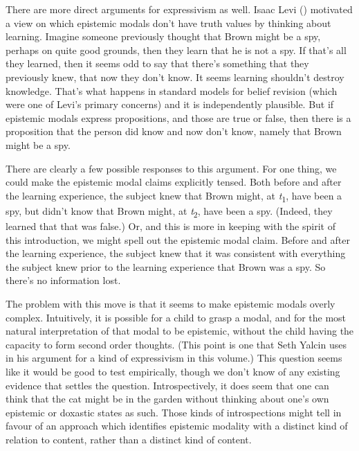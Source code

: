 \documentclass[
  10pt,
  letterpaper,
  DIV=11,
  numbers=noendperiod,
  twoside]{scrartcl}
\begin{document}
There are more direct arguments for expressivism as well. Isaac Levi
() motivated a view on which epistemic
modals don't have truth values by thinking about learning. Imagine
someone previously thought that Brown might be a spy, perhaps on quite
good grounds, then they learn that he is not a spy. If that's all they
learned, then it seems odd to say that there's something that they
previously knew, that now they don't know. It seems learning shouldn't
destroy knowledge. That's what happens in standard models for belief
revision (which were one of Levi's primary concerns) and it is
independently plausible. But if epistemic modals express propositions,
and those are true or false, then there is a proposition that the person
did know and now don't know, namely that Brown might be a spy.

There are clearly a few possible responses to this argument. For one
thing, we could make the epistemic modal claims explicitly tensed. Both
before and after the learning experience, the subject knew that Brown
might, at \emph{t}\textsubscript{1}, have been a spy, but didn't know
that Brown might, at \emph{t}\textsubscript{2}, have been a spy.
(Indeed, they learned that that was false.) Or, and this is more in
keeping with the spirit of this introduction, we might spell out the
epistemic modal claim. Before and after the learning experience, the
subject knew that it was consistent with everything the subject knew
prior to the learning experience that Brown was a spy. So there's no
information lost.

The problem with this move is that it seems to make epistemic modals
overly complex. Intuitively, it is possible for a child to grasp a
modal, and for the most natural interpretation of that modal to be
epistemic, without the child having the capacity to form second order
thoughts. (This point is one that Seth Yalcin uses in his argument for a
kind of expressivism in this volume.) This question seems like it would
be good to test empirically, though we don't know of any existing
evidence that settles the question. Introspectively, it does seem that
one can think that the cat might be in the garden without thinking about
one's own epistemic or doxastic states as such. Those kinds of
introspections might tell in favour of an approach which identifies
epistemic modality with a distinct kind of relation to content, rather
than a distinct kind of content.
\end{document}
